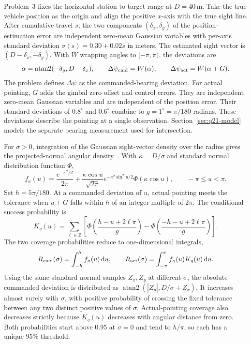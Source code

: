 \documentclass{swmcmthesis}
\begin{document}
Problem~3 fixes the horizontal station-to-target range at \(D=40\,\mathrm m\). Take the true vehicle position as the origin and align the positive \(x\)-axis with the true sight line. After cumulative travel \(s\), the two components \((\delta_x,\delta_y)\) of the position-estimation error are independent zero-mean Gaussian variables with per-axis standard deviation \(\sigma(s)=0.30+0.02s\) in meters. The estimated sight vector is \((D-\delta_x,-\delta_y)\). With \(W\) wrapping angles to \([-\pi,\pi)\), the deviations are
\begin{equation}
\label{eq:q3-bearing-deviations}
\alpha=\operatorname{atan2}(-\delta_y,D-\delta_x),\qquad
\Delta\psi_{\rm cmd}=W(\alpha),\qquad
\Delta\psi_{\rm act}=W(\alpha+G).
\end{equation}
The problem defines \(\Delta\psi\) as the commanded-bearing deviation. For actual pointing, \(G\) adds the gimbal zero-offset and control errors. They are independent zero-mean Gaussian variables and are independent of the position error. Their standard deviations of \(0.8^\circ\) and \(0.6^\circ\) combine to \(g=1^\circ=\pi/180\) radians. These deviations describe the pointing at a single observation. Section~\ref{sec:q21-model} models the separate bearing measurement used for intersection.

For \(\sigma>0\), integration of the Gaussian sight-vector density over the radius gives the projected-normal angular density~\cite{ref:projected-normal}. With \(\kappa=D/\sigma\) and standard normal distribution function \(\Phi\),
\begin{equation}
\label{eq:q3-projected-normal-density}
f_\kappa(u)=\frac{e^{-\kappa^2/2}}{2\pi}
    +\frac{\kappa\cos u}{\sqrt{2\pi}}e^{-\kappa^2\sin^2 u/2}\Phi(\kappa\cos u),
    \qquad -\pi\le u<\pi.
\end{equation}
Set \(h=5\pi/180\). At a commanded deviation of \(u\), actual pointing meets the tolerance when \(u+G\) falls within \(h\) of an integer multiple of \(2\pi\). The conditional success probability is
\begin{equation}
\label{eq:q3-conditional-coverage}
K_g(u)=\sum_{\ell\in\mathbb Z}\left[
\Phi\!\left(\frac{h-u+2\ell\pi}{g}\right)
-\Phi\!\left(\frac{-h-u+2\ell\pi}{g}\right)\right].
\end{equation}
The two coverage probabilities reduce to one-dimensional integrals,
\begin{equation}
\label{eq:q3-coverage-integrals}
R_{\rm cmd}(\sigma)=\int_{-h}^h f_\kappa(u)\,\mathrm du,\qquad
R_{\rm act}(\sigma)=\int_{-\pi}^{\pi} f_\kappa(u)K_g(u)\,\mathrm du.
\end{equation}
Using the same standard normal samples \(Z_x,Z_y\) at different \(\sigma\), the absolute commanded deviation is distributed as \(\operatorname{atan2}(|Z_y|,D/\sigma+Z_x)\). It increases almost surely with \(\sigma\), with positive probability of crossing the fixed tolerance between any two distinct positive values of \(\sigma\). Actual-pointing coverage also decreases strictly because \(K_g(u)\) decreases with angular distance from zero. Both probabilities start above 0.95 at \(\sigma=0\) and tend to \(h/\pi\), so each has a unique 95\% threshold.
\end{document}

